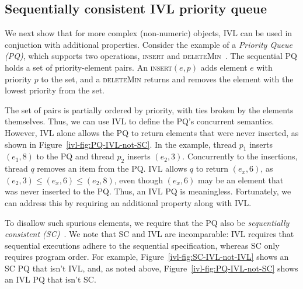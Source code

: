 \subsection{Sequentially consistent IVL priority queue}
\label{ivl-ssec:priority-q}

We next show that for more complex (non-numeric) objects, IVL can be used in conjuction
with additional properties.
Consider the example of a \emph{Priority Queue (PQ)}, which supports two operations, \textsc{insert}
and \textsc{deleteMin}~\cite{van1976design, ronngren1997comparative}.
The sequential PQ holds a set of priority-element pairs.
An \textsc{insert}$(e,p)$ adds element $e$ with priority $p$ to the set,
and a \textsc{deleteMin} returns and removes the element with the lowest priority
from the set.

The set of pairs is partially ordered by priority, with ties broken
by the elements themselves.
Thus, we can use IVL to define the PQ's concurrent semantics.
However, IVL alone allows the PQ to return
elements that were never inserted, as shown in Figure~\ref{ivl-fig:PQ-IVL-not-SC}. In the example, thread $p_1$
inserts $(e_1,8)$ to the PQ and thread $p_2$ inserts $(e_2,3)$. Concurrently to the insertions, thread
$q$ removes an item from the PQ. IVL allows $q$ to return $(e_x,6)$, as $(e_2,3) \leq (e_x,6) \leq (e_2,8)$,
even though $(e_x,6)$ may be an element that was never inserted to the PQ.
Thus, an IVL PQ is meaningless. Fortunately, we can address this by requiring an additional
property along with IVL.

To disallow such spurious elements, we require that the PQ also be \emph{sequentially
consistent (SC)}~\cite{scheurich1987correct}. We note that SC and IVL are incomparable: IVL requires that sequential
executions adhere to the sequential specification, whereas SC only requires program order. For example,
Figure~\ref{ivl-fig:SC-IVL-not-IVL} shows an SC PQ that isn't IVL, and, as noted above, Figure~\ref{ivl-fig:PQ-IVL-not-SC}
shows an IVL PQ that isn't SC.

